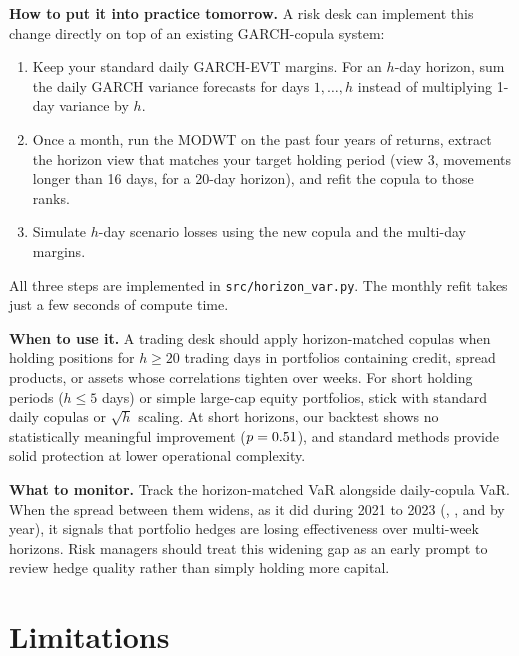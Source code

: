 \documentclass[11pt,a4paper]{article}
\begin{document}
\textbf{How to put it into practice tomorrow.} A risk desk can implement this change directly on top of an existing GARCH-copula system:
\begin{enumerate}[leftmargin=1.5em]
\item Keep your standard daily GARCH-EVT margins. For an $h$-day horizon, sum the daily GARCH variance forecasts for days $1,\dots,h$ instead of multiplying 1-day variance by $h$.
\item Once a month, run the MODWT on the past four years of returns, extract the horizon view that matches your target holding period (view 3, movements longer than 16 days, for a 20-day horizon), and refit the copula to those ranks.
\item Simulate $h$-day scenario losses using the new copula and the multi-day margins.
\end{enumerate}
All three steps are implemented in \texttt{src/horizon\_var.py}. The monthly refit takes just a few seconds of compute time.

\textbf{When to use it.} A trading desk should apply horizon-matched copulas when holding positions for $h \ge 20$ trading days in portfolios containing credit, spread products, or assets whose correlations tighten over weeks. For short holding periods ($h \le 5$ days) or simple large-cap equity portfolios, stick with standard daily copulas or $\sqrt{h}$ scaling. At short horizons, our backtest shows no statistically meaningful improvement ($p = 0.51$), and standard methods provide solid protection at lower operational complexity.

\textbf{What to monitor.} Track the horizon-matched VaR alongside daily-copula VaR. When the spread between them widens, as it did during 2021 to 2023 (\GapYearTwentyOne{}, \GapYearTwentyTwo{}, and \GapYearTwentyThree{} by year), it signals that portfolio hedges are losing effectiveness over multi-week horizons. Risk managers should treat this widening gap as an early prompt to review hedge quality rather than simply holding more capital.

\section{Limitations}
\end{document}
